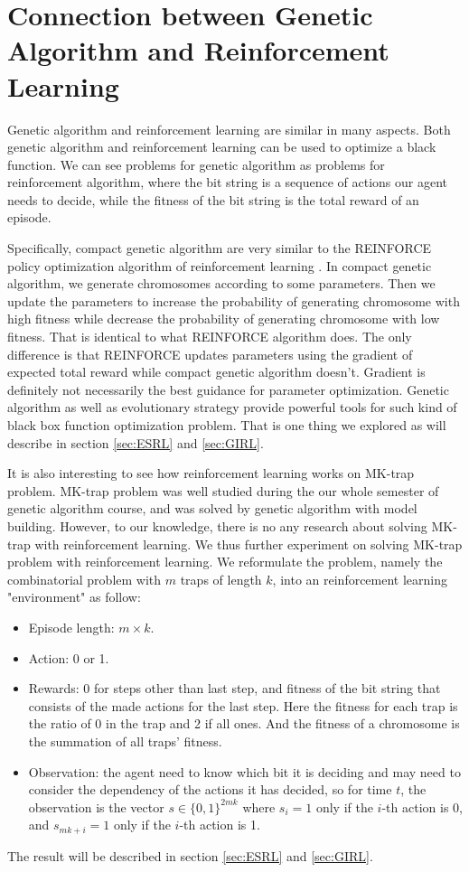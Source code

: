 \documentclass[a4paper]{article}
\begin{document}
 
\section{Connection between Genetic Algorithm and Reinforcement Learning}
\label{sec:GAvsRL}

Genetic algorithm and reinforcement learning are similar in many aspects. Both genetic algorithm and reinforcement learning can be used to optimize a black function. We can see problems for genetic algorithm as problems for reinforcement algorithm, where the bit string is a sequence of actions our agent needs to decide, while the fitness of the bit string is the total reward of an episode. \par

Specifically, compact genetic algorithm are very similar to the REINFORCE policy optimization algorithm of reinforcement learning \cite{DBLP:journals/ml/Williams92}. In compact genetic algorithm, we generate chromosomes according to some parameters. Then we update the parameters to increase the probability of generating chromosome with high fitness while decrease the probability of generating chromosome with low fitness. That is identical to what REINFORCE algorithm does. The only difference is that REINFORCE updates parameters using the gradient of expected total reward while compact genetic algorithm doesn't. Gradient is definitely not necessarily the best guidance for parameter optimization. Genetic algorithm as well as evolutionary strategy provide powerful tools for such kind of black box function optimization problem. That is one thing we explored as will describe in section \ref{sec:ESRL} and \ref{sec:GIRL}.

It is also interesting to see how reinforcement learning works on MK-trap problem. MK-trap problem was well studied during the our whole semester of genetic algorithm course, and was solved by genetic algorithm with model building. However, to our knowledge, there is no any research about solving MK-trap with reinforcement learning. We thus further experiment on solving MK-trap problem with reinforcement learning. We reformulate the problem, namely the combinatorial problem with $m$ traps of length $k$, into an reinforcement learning "environment" as follow:

\begin{itemize}
\item Episode length: $m \times k$.
\item Action: 0 or 1.
\item Rewards: 0 for steps other than last step, and fitness of the bit string that consists of the made actions for the last step. Here the fitness for each trap is the ratio of 0 in the trap and 2 if all ones. And the fitness of a chromosome is the summation of all traps' fitness.
\item Observation: the agent need to know which bit it is deciding and may need to consider the dependency of the actions it has decided, so for time $t$, the observation is the vector $s \in \{0, 1\}^{2mk}$ where $s_i = 1$ only if the $i$-th action is 0, and $s_{mk + i} = 1$ only if the $i$-th action is 1.
\end{itemize}
The result will be described in section \ref{sec:ESRL} and \ref{sec:GIRL}.
\end{document}
